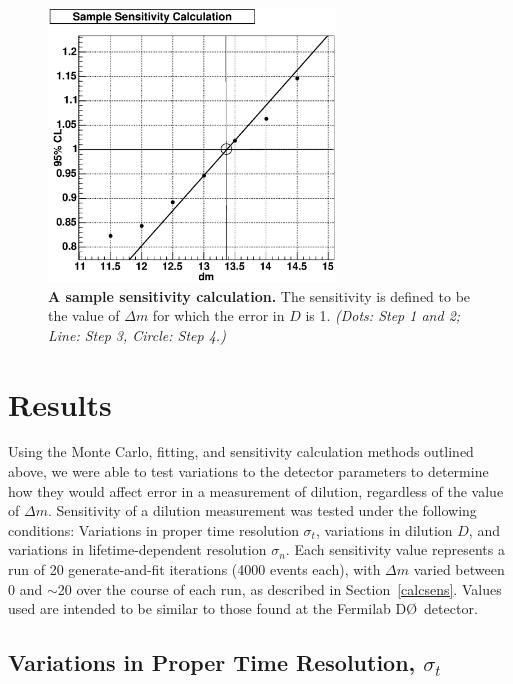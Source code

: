 \documentclass[10pt]{article}
\begin{document}
\begin{figure}
\begin{center}
\includegraphics[width=3in]{sample.eps}
\caption{{\bf A sample sensitivity calculation.}  The sensitivity is
defined to be the value of $\Delta m$ for which the error in $D$
is 1. {\em (Dots: Step 1 and 2; Line: Step 3, Circle: Step 4.)}}
\label{sample}
\end{center}
\end{figure}

\section{Results}

Using the Monte Carlo, fitting, and sensitivity calculation methods outlined above, we
were able to test variations to the detector parameters to
determine how they would affect error in a measurement of
dilution, regardless of the value of $\Delta m$. Sensitivity of a
dilution measurement was tested under the following conditions:
Variations in proper time resolution $\sigma_t$, variations in
dilution $D$, and variations in lifetime-dependent resolution
$\sigma_n$.
Each sensitivity value represents a run of 20 generate-and-fit
iterations (4000 events each), with $\Delta m$ varied between 0
and $\sim$20 over the course of each run, as described in
Section~\ref{calcsens}.  Values used are intended to be similar to
those found at the Fermilab D\O\ detector.

\subsection{Variations in Proper Time Resolution, $\sigma_t$}
\end{document}
